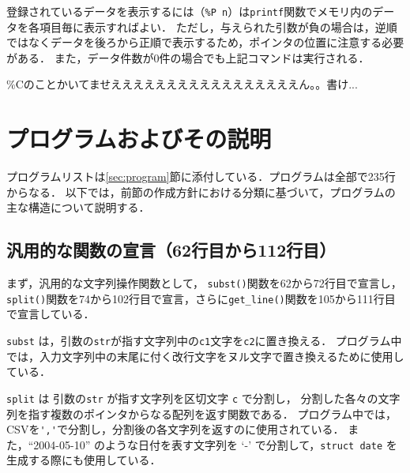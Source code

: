\documentclass[a4j,11pt]{jarticle}
\begin{document}
登録されているデータを表示するには（\verb|%P n|）は\verb|printf|関数でメモリ内のデータを各項目毎に表示すればよい．
ただし，与えられた引数が負の場合は，逆順ではなくデータを後ろから正順で表示するため，ポインタの位置に注意する必要がある．
また，データ件数が0件の場合でも上記コマンドは実行される．


\%Cのことかいてませえええええええええええええええええん。。書け...
\section{プログラムおよびその説明}\label{sec:explain}



プログラムリストは\ref{sec:program}節に添付している．プログラムは全部で235行からなる．
以下では，前節の作成方針における分類に基づいて，プログラムの主な構造について説明する．

\subsection{汎用的な関数の宣言（62行目から112行目）}

まず，汎用的な文字列操作関数として，
\verb|subst()|関数を62から72行目で宣言し，\verb|split()|関数を74から102行目で宣言，さらに\verb|get_line()|関数を105から111行目で宣言している．

\verb|subst| は，引数の\verb|str|が指す文字列中の\verb|c1|文字を\verb|c2|に置き換える．
プログラム中では，入力文字列中の末尾に付く改行文字をヌル文字で置き換えるために使用している．

\verb|split| は 引数の\verb|str| が指す文字列を区切文字 \verb|c| で分割し，
分割した各々の文字列を指す複数のポインタからなる配列を返す関数である．
プログラム中では，CSVを\verb|','|で分割し，分割後の各文字列を返すのに使用されている．
また，``2004-05-10'' のような日付を表す文字列を `-' で分割して，\verb|struct date| を生成する際にも使用している．
\end{document}
